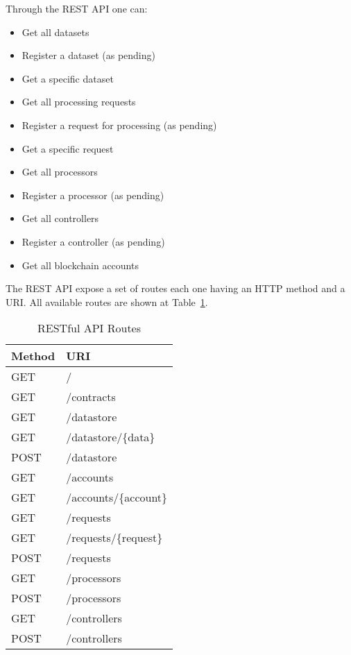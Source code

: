 Through the REST API one can:

\begin{itemize}
  \item Get all datasets
  \item Register a dataset (as pending)
  \item Get a specific dataset
  \item Get all processing requests
  \item Register a request for processing (as pending)
  \item Get a specific request
  \item Get all processors
  \item Register a processor (as pending)
  \item Get all controllers
  \item Register a controller (as pending)
  \item Get all blockchain accounts
\end{itemize}

The REST API expose a set of routes each one having an HTTP method and a URI. All available routes are shown at Table~\ref{table:api_routes}.

\begin{table}[ht!]
\centering
\caption{RESTful API Routes}
\begin{tabular}{|l|l|}
\hline
 Method & URI  \\ \hline
 GET & /\  \\ \hline
 GET &  /contracts \\ \hline
 GET &  /datastore \\ \hline
 GET &  /datastore/\{data\} \\ \hline
 POST &  /datastore\\ \hline
 GET &  /accounts \\ \hline
 GET &  /accounts/\{account\} \\ \hline
 GET &  /requests \\ \hline
 GET &  /requests/\{request\} \\ \hline
 POST &  /requests \\ \hline
 GET &  /processors \\ \hline
 POST &  /processors \\ \hline
 GET &  /controllers \\ \hline
 POST &  /controllers \\ \hline
\end{tabular}
\label{table:api_routes}
\end{table}

